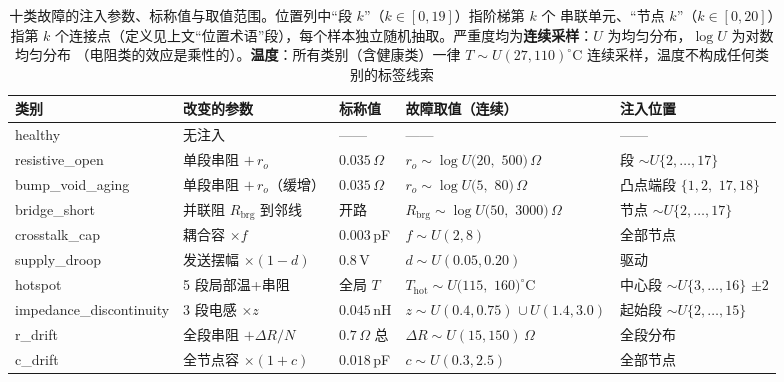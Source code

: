 \documentclass[11pt,a4paper,fontset=mac]{ctexart}
\begin{document}
\begin{table}[h]\centering\footnotesize
\caption{十类故障的注入参数、标称值与取值范围。位置列中“段 $k$”（$k\in[0,19]$）指阶梯第 $k$ 个
串联单元、“节点 $k$”（$k\in[0,20]$）指第 $k$ 个连接点（定义见上文“位置术语”段），每个样本独立随机抽取。严重度均为\textbf{连续采样}：$U$ 为均匀分布，$\log U$ 为对数均匀分布
（电阻类的效应是乘性的）。\textbf{温度}：所有类别（含健康类）一律 $T\sim U(27,110)^\circ$C
连续采样，温度不构成任何类别的标签线索}\label{tab:faultparam}
\setlength{\tabcolsep}{3pt}\renewcommand{\arraystretch}{1.35}
\begin{tabular}{@{}p{2.4cm}p{3.0cm}p{1.35cm}p{4.2cm}p{2.95cm}@{}}
\toprule
类别 & 改变的参数 & 标称值 & 故障取值（连续） & 注入位置 \\
\midrule
healthy & 无注入 & —— & —— & —— \\
resistive\_\allowbreak open & 单段串阻 $+\,r_o$ & $0.035\,\Omega$ & $r_o\sim\log U(20,$ $500)\,\Omega$ & 段 $\sim U\{2,\dots,17\}$ \\
bump\_\allowbreak void\_\allowbreak aging & 单段串阻 $+\,r_o$（缓增） & $0.035\,\Omega$ & $r_o\sim\log U(5,$ $80)\,\Omega$ & 凸点端段 $\{1,2,$ $17,18\}$ \\
bridge\_\allowbreak short & 并联阻 $R_\text{brg}$ 到邻线 & 开路 & $R_\text{brg}\sim\log U(50,$ $3000)\,\Omega$ & 节点 $\sim U\{2,\dots,17\}$ \\
crosstalk\_\allowbreak cap & 耦合容 $\times f$ & $0.003\,$pF & $f\sim U(2,8)$ & 全部节点 \\
supply\_\allowbreak droop & 发送摆幅 $\times(1{-}d)$ & $0.8\,$V & $d\sim U(0.05,0.20)$ & 驱动 \\
hotspot & 5 段局部温+串阻 & 全局 $T$ & $T_\text{hot}\sim U(115,$ $160)^\circ$C & 中心段 $\sim U\{3,\dots,16\}$ $\pm2$ \\
impedance\_\allowbreak discontinuity & 3 段电感 $\times z$ & $0.045\,$nH & $z\sim U(0.4,0.75)$ $\cup\,U(1.4,3.0)$ & 起始段 $\sim U\{2,\dots,15\}$ \\
r\_\allowbreak drift & 全段串阻 $+\Delta R/N$ & $0.7\,\Omega$ 总 & $\Delta R\sim U(15,150)\,\Omega$ & 全段分布 \\
c\_\allowbreak drift & 全节点容 $\times(1{+}c)$ & $0.018\,$pF & $c\sim U(0.3,2.5)$ & 全部节点 \\
\bottomrule
\end{tabular}
\end{table}
\end{document}
